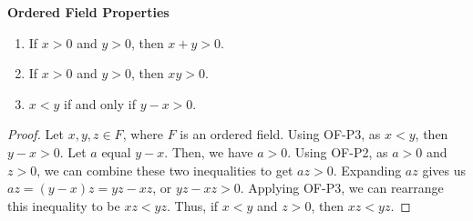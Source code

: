 \documentclass[12pt]{article}
\begin{document}
  \medskip
  \noindent\textbf{Ordered Field Properties}
  \begin{enumerate} 
    \item If $x > 0$ and $y > 0$, then $x + y > 0$.
    \item If $x > 0$ and $y > 0$, then $xy > 0$.
    \item $x < y$ if and only if $y - x > 0$.
  \end{enumerate}

  \begin{proof}
    Let $x, y, z \in F$, where $F$ is an ordered field. Using OF-P3, as $x < y$, then $y - x > 0$. Let $a$ equal $y - x$. Then, we have $a > 0$. Using OF-P2, as $a > 0$ and $z > 0$, we can combine these two inequalities to get $az > 0$. Expanding $az$ gives us $az = (y - x)z = yz - xz$, or $yz - xz > 0$. Applying OF-P3, we can rearrange this inequality to be $xz < yz$. Thus, if $x < y$ and $z > 0 $, then $xz < yz$.
  \end{proof}
\end{document}

